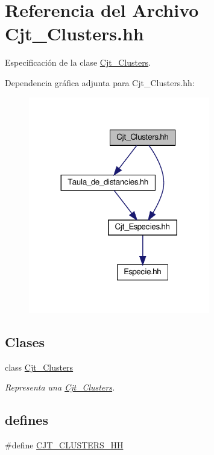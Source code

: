 \hypertarget{_cjt___clusters_8hh}{}\section{Referencia del Archivo Cjt\+\_\+\+Clusters.\+hh}
\label{_cjt___clusters_8hh}


Especificación de la clase \hyperlink{class_cjt___clusters}{Cjt\+\_\+\+Clusters}.  


Dependencia gráfica adjunta para Cjt\+\_\+\+Clusters.\+hh\+:\nopagebreak
\begin{figure}[H]
\begin{center}
\leavevmode
\includegraphics[width=224pt]{_cjt___clusters_8hh__incl}
\end{center}
\end{figure}
\subsection*{Clases}
\begin{DoxyCompactItemize}
\item 
class \hyperlink{class_cjt___clusters}{Cjt\+\_\+\+Clusters}
\begin{DoxyCompactList}\small\item\em Representa una \hyperlink{class_cjt___clusters}{Cjt\+\_\+\+Clusters}. \end{DoxyCompactList}\end{DoxyCompactItemize}
\subsection*{defines}
\begin{DoxyCompactItemize}
\item 
\#define \hyperlink{_cjt___clusters_8hh_ab12f5a8f10a954fe712afecc6ff2eca6}{C\+J\+T\+\_\+\+C\+L\+U\+S\+T\+E\+R\+S\+\_\+\+HH}
\end{DoxyCompactItemize}



